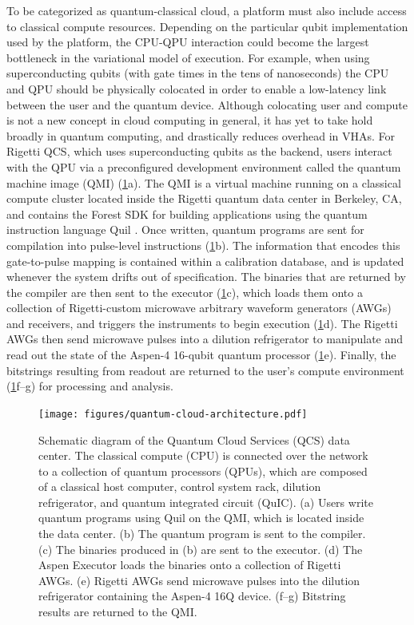 \documentclass[12pt]{iopart}
\begin{document}
To be categorized as quantum-classical cloud, a platform must also include access to classical compute resources. Depending on the particular qubit implementation used by the platform, the CPU-QPU interaction could become the largest bottleneck in the variational model of execution. For example, when using superconducting qubits (with gate times in the tens of nanoseconds) the CPU and QPU should be physically colocated in order to enable a low-latency link between the user and the quantum device. Although colocating user and compute is not a new concept in cloud computing in general, it has yet to take hold broadly in quantum computing, and drastically reduces overhead in VHAs. For Rigetti QCS, which uses superconducting qubits as the backend, users interact with the QPU via a preconfigured development environment called the quantum machine image (QMI) (\cref{fig:QCS-Architecture}a). The QMI is a virtual machine running on a classical compute cluster located inside the Rigetti quantum data center in Berkeley, CA, and contains the Forest SDK \cite{RigettiForestSDK} for building applications using the quantum instruction language Quil \cite{SmithQuil}. Once written, quantum programs are sent for compilation into pulse-level instructions (\cref{fig:QCS-Architecture}b). The information that encodes this gate-to-pulse mapping is contained within a calibration database, and is updated whenever the system drifts out of specification. The binaries that are returned by the compiler are then sent to the executor (\cref{fig:QCS-Architecture}c), which loads them onto a collection of Rigetti-custom microwave arbitrary waveform generators (AWGs) and receivers, and triggers the instruments to begin execution (\cref{fig:QCS-Architecture}d). The Rigetti AWGs then send microwave pulses into a dilution refrigerator to manipulate and read out the state of the Aspen-4 16-qubit quantum processor (\cref{fig:QCS-Architecture}e). Finally, the bitstrings resulting from readout are returned to the user's compute environment (\cref{fig:QCS-Architecture}f--g) for processing and analysis.

\begin{figure}
    \centering
    \texttt{[image: figures/quantum-cloud-architecture.pdf]}
    \caption{
    Schematic diagram of the Quantum Cloud Services (QCS) data center. The classical compute (CPU) is connected over the network to a collection of quantum processors (QPUs), which are composed of a classical host computer, control system rack, dilution refrigerator, and quantum integrated circuit (QuIC).
    (a) Users write quantum programs using Quil on the QMI, which is located inside the data center.
    (b) The quantum program is sent to the compiler. 
    (c) The binaries produced in (b) are sent to the executor.
    (d) The Aspen Executor loads the binaries onto a collection of Rigetti AWGs.
    (e) Rigetti AWGs send microwave pulses into the dilution refrigerator containing the Aspen-4 16Q device. 
    (f--g) Bitstring results are returned to the QMI.
    }
    \label{fig:QCS-Architecture}
\end{figure}
\end{document}
